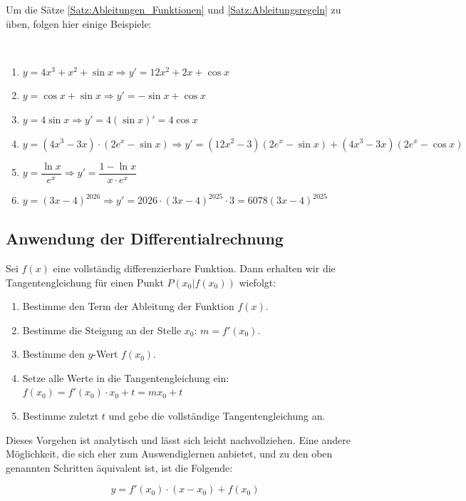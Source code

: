 \documentclass[ngerman, 12pt]{nssheetxea}
\begin{document}
Um die Sätze \ref{Satz:Ableitungen_Funktionen} und \ref{Satz:Ableitungsregeln} zu üben, folgen hier einige Beispiele:

\begin{example} \
\begin{enumerate}
\item $y=4x^3+x^2+ \sin x \Rightarrow y' = 12x^2+2x+\cos x$
\item $y=\cos x + \sin x \Rightarrow y' = - \sin x + \cos x$
\item $y=4 \sin x \Rightarrow y'=4 (\sin x)'=4\cos x$
\item $y=(4x^3-3x)\cdot (2e^x-\sin x) \Rightarrow y'=(12x^2-3)(2e^x-\sin x)+(4x^3-3x)(2e^x-\cos x)$
\item $y=\dfrac{\ln x}{e^x} \Rightarrow y'=\dfrac{1-\ln x}{x\cdot e^x}$
\item $y=(3x-4)^{2026} \Rightarrow y'=2026 \cdot (3x-4)^{2025} \cdot 3 = 6078 (3x-4)^{2025}$
\end{enumerate}
\end{example}

\newpage

\subsection{Anwendung der Differentialrechnung}
\begin{theorem}
Sei $f(x)$ eine vollständig differenzierbare Funktion. Dann erhalten wir die Tangentengleichung für einen Punkt $P(x_0|f(x_0))$ wiefolgt:

\begin{enumerate}
\item Bestimme den Term der Ableitung der Funktion $f(x)$.
\item Bestimme die Steigung an der Stelle $x_0$: $m=f'(x_0)$.
\item Bestimme den $y$-Wert $f(x_0)$. 
\item Setze alle Werte in die Tangentengleichung ein: $f(x_0)=f'(x_0) \cdot x_0 +t = m x_0 +t$
\item Bestimme zuletzt $t$ und gebe die vollständige Tangentengleichung an.
\end{enumerate}
Dieses Vorgehen ist analytisch und lässt sich leicht nachvollziehen. Eine andere Möglichkeit, die sich eher zum Auswendiglernen anbietet, und zu den oben genannten Schritten äquivalent ist, ist die Folgende: \par
\[ y=f'(x_0) \cdot (x-x_0)+f(x_0) \]
\label{Satz:Tangente}
\end{theorem}
\end{document}
